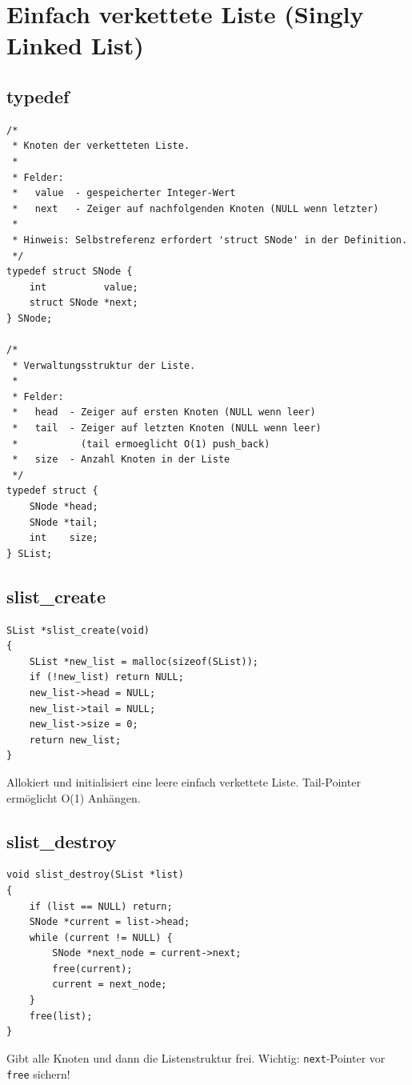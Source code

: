 \documentclass[10pt, a4paper]{article}
\begin{document}
\newpage
\section{Einfach verkettete Liste (Singly Linked List)}

\subsection{typedef}
\begin{lstlisting}
/*
 * Knoten der verketteten Liste.
 *
 * Felder:
 *   value  - gespeicherter Integer-Wert
 *   next   - Zeiger auf nachfolgenden Knoten (NULL wenn letzter)
 *
 * Hinweis: Selbstreferenz erfordert 'struct SNode' in der Definition.
 */
typedef struct SNode {
    int          value;
    struct SNode *next;
} SNode;

/*
 * Verwaltungsstruktur der Liste.
 *
 * Felder:
 *   head  - Zeiger auf ersten Knoten (NULL wenn leer)
 *   tail  - Zeiger auf letzten Knoten (NULL wenn leer)
 *           (tail ermoeglicht O(1) push_back)
 *   size  - Anzahl Knoten in der Liste
 */
typedef struct {
    SNode *head;
    SNode *tail;
    int    size;
} SList;
\end{lstlisting}

\subsection{slist\_create}
\begin{lstlisting}
SList *slist_create(void)
{
    SList *new_list = malloc(sizeof(SList));
    if (!new_list) return NULL;
    new_list->head = NULL;
    new_list->tail = NULL;
    new_list->size = 0;
    return new_list;
}
\end{lstlisting}
Allokiert und initialisiert eine leere einfach verkettete Liste. Tail-Pointer erm\"oglicht O(1) Anh\"angen.

\subsection{slist\_destroy}
\begin{lstlisting}
void slist_destroy(SList *list)
{
    if (list == NULL) return;
    SNode *current = list->head;
    while (current != NULL) {
        SNode *next_node = current->next;
        free(current);
        current = next_node;
    }
    free(list);
}
\end{lstlisting}
Gibt alle Knoten und dann die Listenstruktur frei. Wichtig: \texttt{next}-Pointer vor \texttt{free} sichern!
\end{document}
